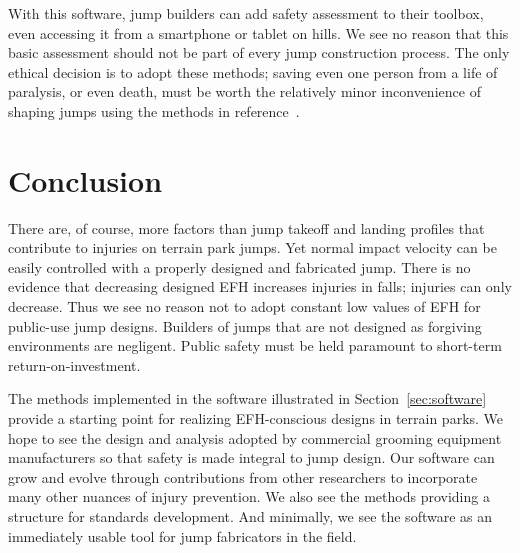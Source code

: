 \documentclass{article}
\begin{document}
With this software, jump builders can add safety assessment to their toolbox,
even accessing it from a smartphone or tablet on hills.  We see no reason that
this basic assessment should not be part of every jump construction process.
The only ethical decision is to adopt these methods; saving even one person
from a life of paralysis, or even death, must be worth the relatively minor
inconvenience of shaping jumps using the methods in reference~\cite{Levy2015}.

\section{Conclusion}
\label{sec:conc}
%
There are, of course, more factors than jump takeoff and landing profiles that
contribute to injuries on terrain park jumps. Yet normal impact velocity can be
easily controlled with a properly designed and fabricated jump. There is no
evidence that decreasing designed EFH increases injuries in falls; injuries can
only decrease. Thus we see no reason not to adopt constant low values of EFH
for public-use jump designs. Builders of jumps that are not designed as
forgiving environments are negligent. Public safety must be held paramount to
short-term return-on-investment.

The methods implemented in the software illustrated in
Section~\ref{sec:software} provide a starting point for realizing EFH-conscious
designs in terrain parks. We hope to see the design and analysis adopted by
commercial grooming equipment manufacturers so that safety is made integral to
jump design. Our software can grow and evolve through contributions from other
researchers to incorporate many other nuances of injury prevention. We also see
the methods providing a structure for standards development. And minimally, we
see the software as an immediately usable tool for jump fabricators in the
field.

\end{document}
